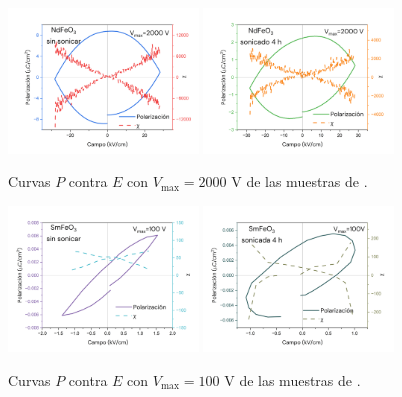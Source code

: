 \documentclass[../main.tex]{subfiles}
\begin{document}
\begin{figure}[H]
    \centering
    \includegraphics[width=0.45\textwidth]{fig/PENdFeO32000V.png}
    \quad
    \includegraphics[width=0.45\textwidth]{fig/PENdFeO3-S2000V.png}
    \caption{Curvas $P$ contra $E$ con $V_\text{max}=2000$ V de las muestras de \neod{}.}
    \label{fig:nd2000v}
\end{figure}
\begin{figure}[H]
    \centering
    \includegraphics[width=0.45\textwidth]{fig/PESmFeO3100V.png}
    \quad
    \includegraphics[width=0.45\textwidth]{fig/PESmFeO3-S100V.png}
    \caption{Curvas $P$ contra $E$ con $V_\text{max}=100$ V de las muestras de \sama{}.}
    \label{fig:sm100v}
\end{figure}
\end{document}
